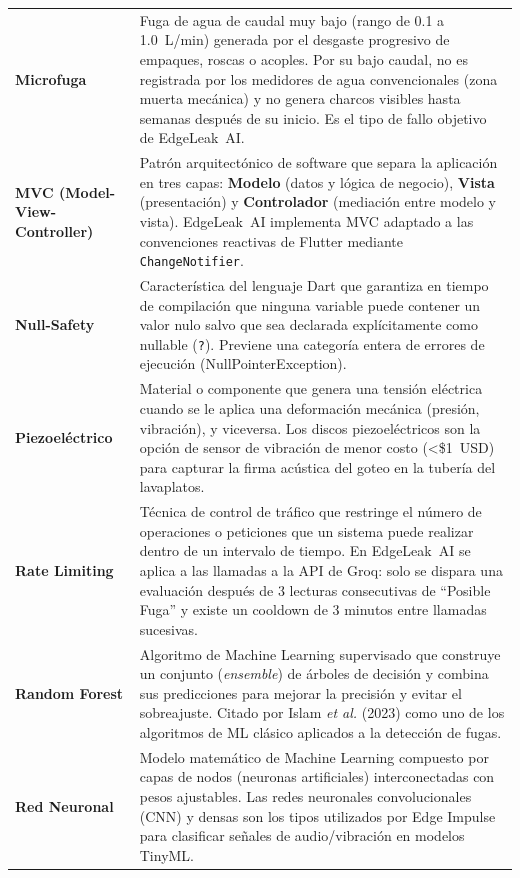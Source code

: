 \documentclass[12pt,a4paper]{article}
\begin{document}
\begin{longtable}{>{\bfseries}p{3.8cm} p{10.5cm}}
Microfuga & Fuga de agua de caudal muy bajo (rango de 0.1 a 1.0~L/min) generada por el
desgaste progresivo de empaques, roscas o acoples. Por su bajo caudal, no es registrada
por los medidores de agua convencionales (zona muerta mecánica) y no genera charcos
visibles hasta semanas después de su inicio. Es el tipo de fallo objetivo de EdgeLeak~AI.
\\[0.5em]

MVC (Model-View-Controller) & Patrón arquitectónico de software que separa la aplicación
en tres capas: \textbf{Modelo} (datos y lógica de negocio), \textbf{Vista} (presentación)
y \textbf{Controlador} (mediación entre modelo y vista). EdgeLeak~AI implementa MVC
adaptado a las convenciones reactivas de Flutter mediante \texttt{ChangeNotifier}.
\\[0.5em]

Null-Safety & Característica del lenguaje Dart que garantiza en tiempo de compilación
que ninguna variable puede contener un valor nulo salvo que sea declarada explícitamente
como nullable (\texttt{?}). Previene una categoría entera de errores de ejecución
(NullPointerException).
\\[0.5em]

Piezoeléctrico & Material o componente que genera una tensión eléctrica cuando se le
aplica una deformación mecánica (presión, vibración), y viceversa. Los discos
piezoeléctricos son la opción de sensor de vibración de menor costo (\textless{}\$1~USD)
para capturar la firma acústica del goteo en la tubería del lavaplatos.
\\[0.5em]

Rate Limiting & Técnica de control de tráfico que restringe el número de operaciones
o peticiones que un sistema puede realizar dentro de un intervalo de tiempo. En
EdgeLeak~AI se aplica a las llamadas a la API de Groq: solo se dispara una evaluación
después de 3 lecturas consecutivas de ``Posible Fuga'' y existe un cooldown de 3 minutos
entre llamadas sucesivas.
\\[0.5em]

Random Forest & Algoritmo de Machine Learning supervisado que construye un conjunto
(\textit{ensemble}) de árboles de decisión y combina sus predicciones para mejorar la
precisión y evitar el sobreajuste. Citado por Islam \textit{et al.} (2023) como uno de
los algoritmos de ML clásico aplicados a la detección de fugas.
\\[0.5em]

Red Neuronal & Modelo matemático de Machine Learning compuesto por capas de nodos
(neuronas artificiales) interconectadas con pesos ajustables. Las redes neuronales
convolucionales (CNN) y densas son los tipos utilizados por Edge Impulse para clasificar
señales de audio/vibración en modelos TinyML.
\\[0.5em]


\end{longtable}
\end{document}
